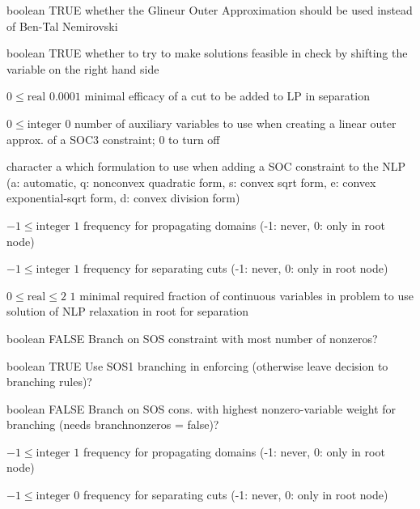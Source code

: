 %
{boolean}%
{TRUE}%
{whether the Glineur Outer Approximation should be used instead of Ben-Tal Nemirovski}%
{}

%
{boolean}%
{TRUE}%
{whether to try to make solutions feasible in check by shifting the variable on the right hand side}%
{}

%
{$0\leq\textrm{real}$}%
{$0.0001$}%
{minimal efficacy of a cut to be added to LP in separation}%
{}

%
{$0\leq\textrm{integer}$}%
{$0$}%
{number of auxiliary variables to use when creating a linear outer approx. of a SOC3 constraint; 0 to turn off}%
{}

%
{character}%
{a}%
{which formulation to use when adding a SOC constraint to the NLP (a: automatic, q: nonconvex quadratic form, s: convex sqrt form, e: convex exponential-sqrt form, d: convex division form)}%
{}

%
{$-1\leq\textrm{integer}$}%
{$1$}%
{frequency for propagating domains (-1: never, 0: only in root node)}%
{}

%
{$-1\leq\textrm{integer}$}%
{$1$}%
{frequency for separating cuts (-1: never, 0: only in root node)}%
{}

%
{$0\leq\textrm{real}\leq2$}%
{$1$}%
{minimal required fraction of continuous variables in problem to use solution of NLP relaxation in root for separation}%
{}

%
{boolean}%
{FALSE}%
{Branch on SOS constraint with most number of nonzeros?}%
{}

%
{boolean}%
{TRUE}%
{Use SOS1 branching in enforcing (otherwise leave decision to branching rules)?}%
{}

%
{boolean}%
{FALSE}%
{Branch on SOS cons. with highest nonzero-variable weight for branching (needs branchnonzeros = false)?}%
{}

%
{$-1\leq\textrm{integer}$}%
{$1$}%
{frequency for propagating domains (-1: never, 0: only in root node)}%
{}

%
{$-1\leq\textrm{integer}$}%
{$0$}%
{frequency for separating cuts (-1: never, 0: only in root node)}%
{}


